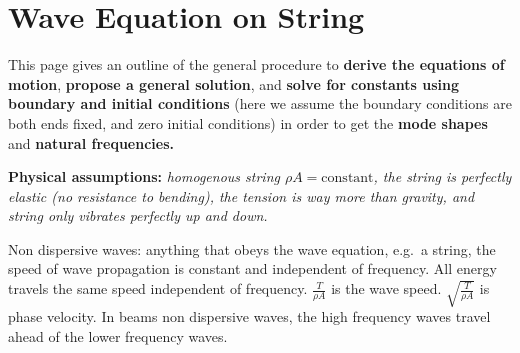 \documentclass[letterpaper,twocolumn,notitlepage]{article}
\begin{document}
  \clearpage

  \section*{Wave Equation on String}

  \noindent This page gives an outline of the general procedure to \textbf{derive the equations of motion}, \textbf{propose a general solution}, and \textbf{solve for constants using boundary and initial conditions} (here we assume the boundary conditions are both ends fixed, and zero initial conditions) in order to get the \textbf{mode shapes} and \textbf{natural frequencies.}

  \textbf{Physical assumptions:} \textit{homogenous string $\rho A=\text{constant}$, the string is perfectly elastic (no resistance to bending), the tension is way more than gravity, and string only vibrates perfectly up and down.}

  Non dispersive waves: anything that obeys the wave equation, e.g.\ a string, the speed of wave propagation is constant and independent of frequency.
  All energy travels the same speed independent of frequency.
  $\frac{T}{\rho A}$ is the wave speed.
  $\sqrt{\frac{T}{\rho A}}$ is phase velocity.
  In beams non dispersive waves, the high frequency waves travel ahead of the lower frequency waves.
\end{document}
